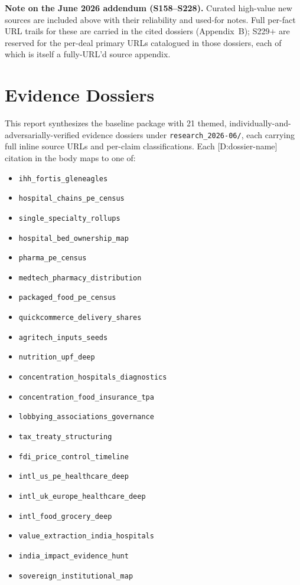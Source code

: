 \documentclass[11pt,a4paper]{article}
\newcommand{\cs}[1]{\textnormal{[#1]}}
\begin{document}
\noindent\textbf{Note on the June 2026 addendum (S158--S228).} Curated high-value new sources are included above with their reliability and used-for notes. Full per-fact URL trails for these are carried in the cited dossiers (Appendix~B); S229$+$ are reserved for the per-deal primary URLs catalogued in those dossiers, each of which is itself a fully-URL'd source appendix.

\section{Evidence Dossiers}\label{app:dossiers}
This report synthesizes the baseline package with 21 themed, individually-and-adversarially-verified evidence dossiers under \texttt{research\_2026-06/}, each carrying full inline source URLs and per-claim classifications. Each \cs{D:dossier-name} citation in the body maps to one of:

\begin{itemize}[leftmargin=1.6em,itemsep=2pt]
\item \texttt{ihh\_fortis\_gleneagles}
\item \texttt{hospital\_chains\_pe\_census}
\item \texttt{single\_specialty\_rollups}
\item \texttt{hospital\_bed\_ownership\_map}
\item \texttt{pharma\_pe\_census}
\item \texttt{medtech\_pharmacy\_distribution}
\item \texttt{packaged\_food\_pe\_census}
\item \texttt{quickcommerce\_delivery\_shares}
\item \texttt{agritech\_inputs\_seeds}
\item \texttt{nutrition\_upf\_deep}
\item \texttt{concentration\_hospitals\_diagnostics}
\item \texttt{concentration\_food\_insurance\_tpa}
\item \texttt{lobbying\_associations\_governance}
\item \texttt{tax\_treaty\_structuring}
\item \texttt{fdi\_price\_control\_timeline}
\item \texttt{intl\_us\_pe\_healthcare\_deep}
\item \texttt{intl\_uk\_europe\_healthcare\_deep}
\item \texttt{intl\_food\_grocery\_deep}
\item \texttt{value\_extraction\_india\_hospitals}
\item \texttt{india\_impact\_evidence\_hunt}
\item \texttt{sovereign\_institutional\_map}
\end{itemize}
\end{document}
